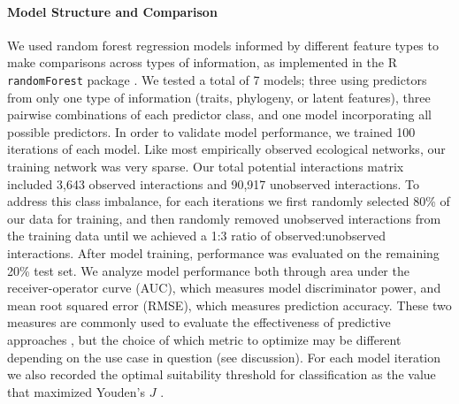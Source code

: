 \documentclass[openacc]{rsproca_new}%
\begin{document}
\paragraph{Model Structure and Comparison} We used random forest regression models informed by different feature types to make comparisons across types of information, as implemented in the R \texttt{randomForest} package \cite{randomForest}. We tested a total of 7 models; three using predictors from only one type of information (traits, phylogeny, or latent features), three pairwise combinations of each predictor class, and one model incorporating all possible predictors. In order to validate model performance, we trained 100 iterations of each model. Like most empirically observed ecological networks, our training network was very sparse\cite{vazquez2009uniting}. Our total potential interactions matrix included 3,643 observed interactions and 90,917 unobserved interactions. To address this class imbalance, for each iterations we first randomly selected 80\% of our data for training, and then randomly removed unobserved interactions from the training data until we achieved a 1:3 ratio of observed:unobserved interactions. After model training, performance was evaluated on the remaining 20\% test set. We analyze model performance both through area under the receiver-operator curve (AUC), which measures model discriminator power, and mean root squared error (RMSE), which measures prediction accuracy. These two measures are commonly used to evaluate the effectiveness of predictive approaches \cite{norberg2019comprehensive}, but the choice of which metric to optimize may be different depending on the use case in question (see discussion). For each model iteration we also recorded the optimal suitability threshold for classification as the value that maximized Youden's $J$ \cite{youden1950index}.
\end{document}
